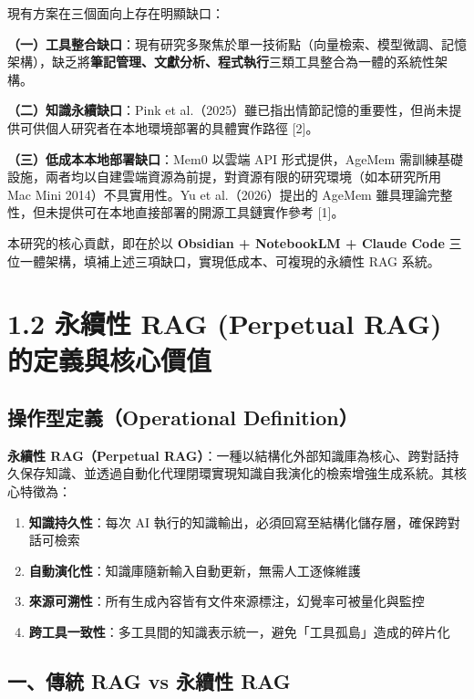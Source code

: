 現有方案在三個面向上存在明顯缺口：

\textbf{（一）工具整合缺口}：現有研究多聚焦於單一技術點（向量檢索、模型微調、記憶架構），缺乏將\textbf{筆記管理、文獻分析、程式執行}三類工具整合為一體的系統性架構。

\textbf{（二）知識永續缺口}：Pink et
al.（2025）雖已指出情節記憶的重要性，但尚未提供可供個人研究者在本地環境部署的具體實作路徑
{[}2{]}。

\textbf{（三）低成本本地部署缺口}：Mem0 以雲端 API 形式提供，AgeMem
需訓練基礎設施，兩者均以自建雲端資源為前提，對資源有限的研究環境（如本研究所用
Mac Mini 2014）不具實用性。Yu et al.（2026）提出的 AgeMem
雖具理論完整性，但未提供可在本地直接部署的開源工具鏈實作參考 {[}1{]}。

本研究的核心貢獻，即在於以 \textbf{Obsidian + NotebookLM + Claude Code}
三位一體架構，填補上述三項缺口，實現低成本、可複現的永續性 RAG 系統。

\chapter{1.2 永續性 RAG (Perpetual RAG)
的定義與核心價值}\label{ux6c38ux7e8cux6027-rag-perpetual-rag-ux7684ux5b9aux7fa9ux8207ux6838ux5fc3ux50f9ux503c}

\section{操作型定義（Operational
Definition）}\label{ux64cdux4f5cux578bux5b9aux7fa9operational-definition}

\textbf{永續性 RAG（Perpetual
RAG）}：一種以結構化外部知識庫為核心、跨對話持久保存知識、並透過自動化代理閉環實現知識自我演化的檢索增強生成系統。其核心特徵為：

\begin{enumerate}
\def\labelenumi{\arabic{enumi}.}
\tightlist
\item
  \textbf{知識持久性}：每次 AI
  執行的知識輸出，必須回寫至結構化儲存層，確保跨對話可檢索
\item
  \textbf{自動演化性}：知識庫隨新輸入自動更新，無需人工逐條維護
\item
  \textbf{來源可溯性}：所有生成內容皆有文件來源標注，幻覺率可被量化與監控
\item
  \textbf{跨工具一致性}：多工具間的知識表示統一，避免「工具孤島」造成的碎片化
\end{enumerate}

\section{一、傳統 RAG vs 永續性
RAG}\label{ux4e00ux50b3ux7d71-rag-vs-ux6c38ux7e8cux6027-rag}

